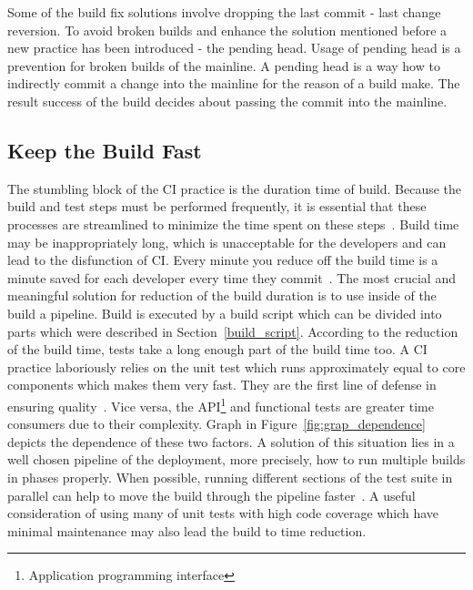 Some of the build fix solutions involve dropping the last commit - last change reversion. To avoid broken builds and enhance the solution mentioned before a new practice has been introduced - the pending head. Usage of pending head is a prevention for broken builds of the mainline. A pending head is a way how to indirectly commit a change into the mainline for the reason of a build make. The result success of the build decides about passing the commit into the mainline.

\subsection{Keep the Build Fast}

The stumbling block of the CI practice is the duration time of build. Because the build and test steps must be performed frequently, it is essential that these processes are streamlined to minimize the time spent on these steps~\cite{DigitalOceanCI}. Build time may be inappropriately long, which is unacceptable for the developers and can lead to the disfunction of CI. Every minute you reduce off the build time is a minute saved for each developer every time they commit~\cite{MartinFowler}. The most crucial and meaningful solution for reduction of the build duration is to use inside of the build a pipeline. Build is executed by a build script which can be divided into parts which were described in Section~\ref{build_script}. According to the reduction of the build time, tests take a long enough part of the build time too. A CI practice laboriously relies on the unit test which runs approximately equal to core components which makes them very fast. They are the first line of defense in ensuring quality~\cite{CI_atlassian}. Vice versa, the API\footnote{Application programming interface} and functional tests are greater time consumers due to their complexity. Graph in Figure~\ref{fig:grap_dependence} depicts the dependence of these two factors. A solution of this situation lies in a well chosen pipeline of the deployment, more  precisely, how to run multiple builds in phases properly. When possible, running different sections of the test suite in parallel can help to move the build through the pipeline faster~\cite{DigitalOceanCI}. A useful consideration of using many of unit tests with high code coverage which have minimal maintenance may also lead the build to time reduction.

